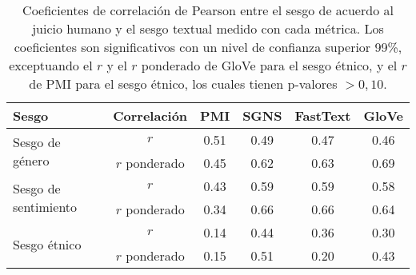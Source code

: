 

\begin{table}[h]
  \centering
  \begin{tabular}{lccccc}
    \toprule
    Sesgo                                    & Correlación   & PMI                & SGNS & FastText & GloVe              \\
    \midrule
    \multirow[c]{2}{*}{Sesgo de género}      & $r$           & 0.51               & 0.49 & 0.47     & 0.46               \\
                                             & $r$ ponderado & 0.45               & 0.62 & 0.63     & 0.69               \\
    \cline{1-6}
    \multirow[c]{2}{*}{Sesgo de sentimiento} & $r$           & 0.43               & 0.59 & 0.59     & 0.58               \\
                                             & $r$ ponderado & 0.34               & 0.66 & 0.66     & 0.64               \\
    \cline{1-6}
    \multirow[c]{2}{*}{Sesgo étnico}         & $r$           & {\color{gray}0.14} & 0.44 & 0.36     & {\color{gray}0.30} \\
                                             & $r$ ponderado & 0.15               & 0.51 & 0.20     & {\color{gray}0.43} \\
    \cline{1-6}
    \bottomrule
  \end{tabular}
  \caption[Coeficientes de correlación de Pearson entre el sesgo de acuerdo al juicio humano y el sesgo textual medido con cada métrica]{
    Coeficientes de correlación de Pearson entre el sesgo de acuerdo al juicio humano y el sesgo textual medido con cada métrica. Los coeficientes son significativos con un nivel de confianza superior 99\%, exceptuando el $r$ y el $r$ ponderado de GloVe para el sesgo étnico, y el $r$ de PMI para el sesgo étnico, los cuales tienen p-valores $> 0,10$.
  }
  \label{tab:correlaciones}
\end{table}



